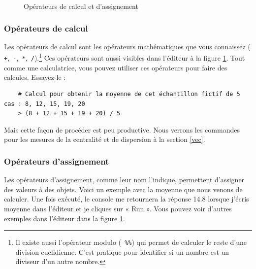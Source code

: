 \documentclass[10.5pt,a4paper]{article}
\newcommand{\rcode}[1]{\texttt{\color{rstudio} #1}}
\begin{document}
 \begin{figure}[H]
    \centering
    \caption{Opérateurs de calcul et d'assignement}
    \label{opeAssign}
    \end{figure}
  
    \subsubsection{Opérateurs de calcul}
    Les opérateurs de calcul sont les opérateurs mathématiques que vous connaissez (\rcode{+},\rcode{-},\rcode{*},\rcode{/}).\footnote{Il existe aussi l'opérateur modulo (\rcode{\%\%}) qui permet de calculer le reste d'une division euclidienne. C'est pratique pour identifier si un nombre est un diviseur d'un autre nombre.} Ces opérateurs sont aussi visibles dans l'éditeur à la figure \ref{opeAssign}. Tout comme une calculatrice, vous pouvez utiliser ces opérateurs pour faire des calcules. Essayez-le :
    
  \begin{lstlisting}
    # Calcul pour obtenir la moyenne de cet échantillon fictif de 5 cas : 8, 12, 15, 19, 20
    > (8 + 12 + 15 + 19 + 20) / 5
  \end{lstlisting}

Mais cette façon de procéder est peu productive. Nous verrons les commandes pour les mesures de la centralité et de dispersion à la section \ref{vec}.

    \subsubsection{Opérateurs d'assignement}
    Les opérateurs d'assignement, comme leur nom l'indique, permettent d'assigner des valeurs à des objets. Voici un exemple avec la moyenne que nous venons de calculer. Une fois exécuté, le console me retournera la réponse 14.8 lorsque j'écris moyenne dans l'éditeur et je cliques sur « Run ». Vous pouvez voir d'autres exemples dans l'éditeur dans la figure \ref{opeAssign}.
    
\end{document}
